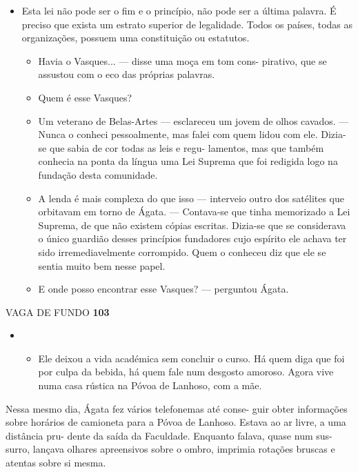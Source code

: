\begin{itemize}
\item
  Esta lei não pode ser o fim e o princípio, não pode ser a última
  palavra. É preciso que exista um estrato superior de legalidade. Todos
  os países, todas as organizações, possuem uma constituição ou
  estatutos.

  \begin{itemize}
  \tightlist
  \item
    Havia o Vasques... --- disse uma moça em tom cons- pirativo, que se
    assustou com o eco das próprias palavras.
  \item
    Quem é esse Vasques?
  \item
    Um veterano de Belas-Artes --- esclareceu um jovem de olhos cavados.
    --- Nunca o conheci pessoalmente, mas falei com quem lidou com ele.
    Dizia-se que sabia de cor todas as leis e regu- lamentos, mas que
    também conhecia na ponta da língua uma Lei Suprema que foi redigida
    logo na fundação desta comunidade.
  \item
    A lenda é mais complexa do que isso --- interveio outro dos
    satélites que orbitavam em torno de Ágata. --- Contava-se que tinha
    memorizado a Lei Suprema, de que não existem cópias escritas.
    Dizia-se que se considerava o único guardião desses princípios
    fundadores cujo espírito ele achava ter sido irremediavelmente
    corrompido. Quem o conheceu diz que ele se sentia muito bem nesse
    papel.
  \item
    E onde posso encontrar esse Vasques? --- perguntou Ágata.
  \end{itemize}
\end{itemize}

VAGA DE FUNDO \textbf{103}

\begin{itemize}
\item
  \begin{itemize}
  \tightlist
  \item
    Ele deixou a vida académica sem concluir o curso. Há quem diga que
    foi por culpa da bebida, há quem fale num desgosto amoroso. Agora
    vive numa casa rústica na Póvoa de Lanhoso, com a mãe.
  \end{itemize}
\end{itemize}

Nessa mesmo dia, Ágata fez vários telefonemas até conse- guir obter
informações sobre horários de camioneta para a Póvoa de Lanhoso. Estava
ao ar livre, a uma distância pru- dente da saída da Faculdade. Enquanto
falava, quase num sus- surro, lançava olhares apreensivos sobre o ombro,
imprimia rotações bruscas e atentas sobre si mesma.

